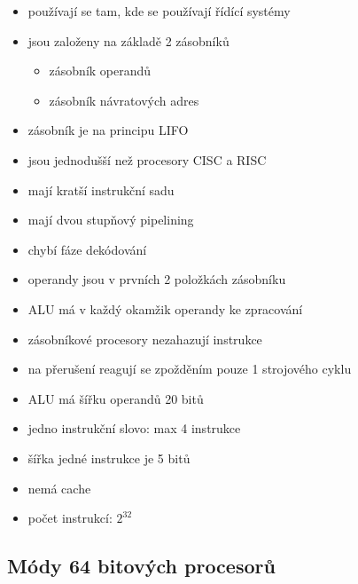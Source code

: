 \documentclass[a4paper,12pt]{article}
\providecommand{\tightlist}{%
\setlength{\itemsep}{0pt}\setlength{\parskip}{0pt}}
\begin{document}
\begin{itemize}
\tightlist
\item používají se tam, kde se používají řídící systémy
\item jsou založeny na základě 2 zásobníků

  \begin{itemize}
  \tightlist
  \item zásobník operandů
  \item zásobník návratových adres
  \end{itemize}
\item zásobník je na principu LIFO
\item jsou jednodušší než procesory CISC a RISC
\item mají kratší instrukční sadu
\item mají dvou stupňový pipelining
\item chybí fáze dekódování
\item operandy jsou v prvních 2 položkách zásobníku
\item ALU má v každý okamžik operandy ke zpracování
\item zásobníkové procesory nezahazují instrukce
\item na přerušení reagují se zpožděním pouze 1 strojového cyklu
\item ALU má šířku operandů 20 bitů
\item jedno instrukční slovo: max 4 instrukce
\item šířka jedné instrukce je 5 bitů
\item nemá cache
\item počet instrukcí: $2^{32}$
\end{itemize}

\subsection{Módy 64 bitových procesorů}
\end{document}
